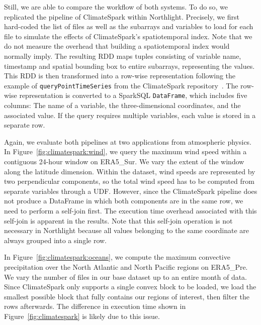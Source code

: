 \documentclass[conference]{IEEEtran}
\newcommand{\system}{Northlight}
\newcommand{\smalltt}[1]{{\texttt{\small #1}}}
\begin{document}
Still, we are able to compare the workflow of both systems. To do so, we replicated the pipeline of ClimateSpark within \system{}. Precisely, we first hard-coded the list of files as well as the subarrays and variables to load for each file to simulate the effects of ClimateSpark's spatiotemporal index. Note that we do not measure the overhead that building a spatiotemporal index would normally imply. 
The resulting RDD maps tuples consisting of variable name, timestamp and spatial bounding box to entire subarrays, representing the values.
This RDD is then transformed into a row-wise representation following the example of \smalltt{queryPointTimeSeries} from the ClimateSpark repository~\cite{lit:climatespark-github}. The row-wise representation is converted to a SparkSQL \smalltt{DataFrame}, which includes five columns: The name of a variable, the three-dimensional coordinates, and the associated value.
If the query requires multiple variables, each value is stored in a separate row.

Again, we evaluate both pipelines at two applications from atmospheric physics.
In Figure~\ref{fig:climatespark:wind}, we query the maximum wind speed within a contiguous 24-hour window on ERA5\_Sur.
We vary the extent of the window along the latitude dimension.
Within the dataset, wind speeds are represented by two perpendicular components, so the total wind speed has to be computed from separate variables through a UDF.
However, since the ClimateSpark pipeline does not produce a DataFrame in which both components are in the same row, we need to perform a self-join first.
The execution time overhead associated with this self-join is apparent in the results.
Note that this self-join operation is not necessary in \system{} because all values belonging to the same coordinate are always grouped into a single row.


In Figure~\ref{fig:climatespark:oceans}, we compute the maximum convective precipitation over the North Atlantic and North Pacific regions on ERA5\_Pre.
We vary the number of files in our base dataset up to an entire month of data.
Since ClimateSpark only supports a single convex block to be loaded, we load the smallest possible block that fully contains our regions of interest, then filter the rows afterwards.
The difference in execution time shown in Figure~\ref{fig:climatespark} is likely due to this issue.

\vspace*{-0.2cm}
\end{document}
